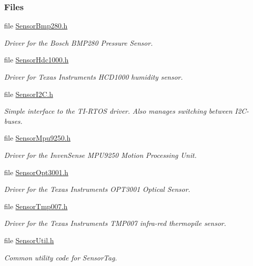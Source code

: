\subsubsection*{Files}
\begin{DoxyCompactItemize}
\item 
file \hyperlink{_sensor_bmp280_8h}{Sensor\+Bmp280.\+h}
\begin{DoxyCompactList}\small\item\em Driver for the Bosch B\+M\+P280 Pressure Sensor. \end{DoxyCompactList}\item 
file \hyperlink{_sensor_hdc1000_8h}{Sensor\+Hdc1000.\+h}
\begin{DoxyCompactList}\small\item\em Driver for Texas Instruments H\+C\+D1000 humidity sensor. \end{DoxyCompactList}\item 
file \hyperlink{_sensor_i2_c_8h}{Sensor\+I2\+C.\+h}
\begin{DoxyCompactList}\small\item\em Simple interface to the T\+I-\/\+R\+T\+O\+S driver. Also manages switching between I2\+C-\/buses. \end{DoxyCompactList}\item 
file \hyperlink{_sensor_mpu9250_8h}{Sensor\+Mpu9250.\+h}
\begin{DoxyCompactList}\small\item\em Driver for the Inven\+Sense M\+P\+U9250 Motion Processing Unit. \end{DoxyCompactList}\item 
file \hyperlink{_sensor_opt3001_8h}{Sensor\+Opt3001.\+h}
\begin{DoxyCompactList}\small\item\em Driver for the Texas Instruments O\+P\+T3001 Optical Sensor. \end{DoxyCompactList}\item 
file \hyperlink{_sensor_tmp007_8h}{Sensor\+Tmp007.\+h}
\begin{DoxyCompactList}\small\item\em Driver for the Texas Instruments T\+M\+P007 infra-\/red thermopile sensor. \end{DoxyCompactList}\item 
file \hyperlink{_sensor_util_8h}{Sensor\+Util.\+h}
\begin{DoxyCompactList}\small\item\em Common utility code for Sensor\+Tag. \end{DoxyCompactList}\end{DoxyCompactItemize}
